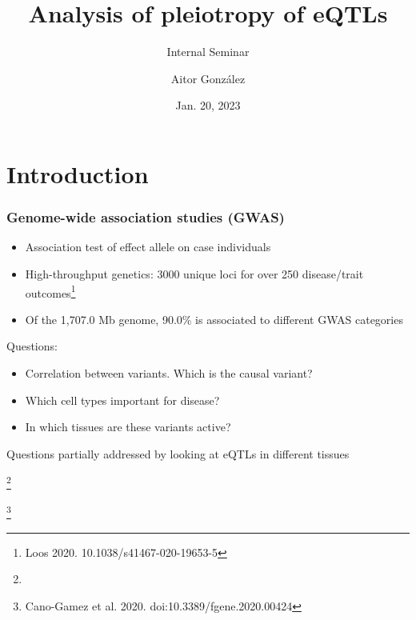 \documentclass{beamer}
\title{Analysis of pleiotropy of eQTLs}
\subtitle{Internal Seminar}
\author{Aitor Gonz\'alez}
\institute{Aix Marseille Univ, INSERM, TAGC}
\date{Jan. 20, 2023}
\newcommand\blfootnote[1]{%
    \begingroup
    \renewcommand\thefootnote{}\footnote{#1}%
    \addtocounter{footnote}{-1}%
    \endgroup
}
\begin{document}
    \begin{frame}

        \titlepage

    \end{frame}

    \section{Introduction} %

    \begin{frame}
        \frametitle{Genome-wide association studies (GWAS)}

        \begin{itemize}
            \item Association test of effect allele on case individuals
            \item High-throughput genetics: 3000 unique loci for over 250 disease/trait outcomes\footnote{Loos 2020. 10.1038/s41467-020-19653-5}
            \item Of the 1,707.0 Mb genome, 90.0\% is associated to different GWAS categories
        \end{itemize}
%
        \vfill

        Questions:
%
        \begin{itemize}
            \item Correlation between variants. Which is the causal variant?
            \item Which cell types important for disease?
            \item In which tissues are these variants active?
        \end{itemize}
%
        \vfill
%
        Questions partially addressed by looking at eQTLs in different tissues

        \blfootnote{}
        \blfootnote{Cano-Gamez et al. 2020. doi:10.3389/fgene.2020.00424}
    \end{frame}
\end{document}
